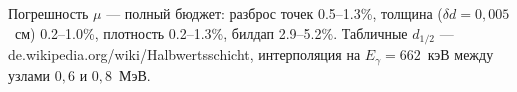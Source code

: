\documentclass[a4paper,12pt]{article}
\begin{document}
\begin{center}\small
Погрешность $\mu$ --- полный бюджет: разброс точек
0.5--1.3\%,
толщина ($\delta d=0{,}005$~см) 0.2--1.0\%,
плотность 0.2--1.3\%,
билдап 2.9--5.2\%.
Табличные $d_{1/2}$ --- de.wikipedia.org/wiki/Halbwertsschicht,
интерполяция на $E_\gamma=662$~кэВ между узлами $0{,}6$ и $0{,}8$~МэВ.
\end{center}
\end{document}
